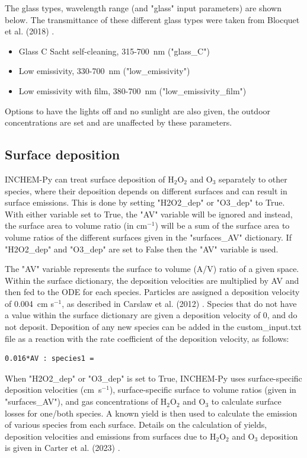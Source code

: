 \documentclass[a4paper]{refart}
\begin{document}
The glass types, wavelength range (and "glass" input parameters) are shown below. The transmittance of these different glass types were taken from Blocquet et al. (2018) \cite{Blocquet2018}.
\begin{itemize}
    \item Glass C Sacht self-cleaning, 315-700~nm ("glass\_C")
    \item Low emissivity, 330-700~nm ("low\_emissivity")
    \item Low emissivity with film, 380-700~nm ("low\_emissivity\_film")
\end{itemize}

Options to have the lights off and no sunlight are also given, the outdoor concentrations are set and are unaffected by these parameters.

\subsection{Surface deposition}\label{surface_dictionary.py}
INCHEM-Py can treat surface deposition of H$_2$O$_2$ and O$_3$ separately to other species, where their deposition depends on different surfaces and can result in surface emissions. This is done by setting "H2O2\_dep" or "O3\_dep" to True. With either variable set to True, the "AV" variable will be ignored and instead, the surface area to volume ratio (in cm$^{-1}$) will be a sum of the surface area to volume ratios of the different surfaces given in the "surfaces\_AV" dictionary. If "H2O2\_dep" and "O3\_dep" are set to False then the "AV" variable is used.

The "AV" variable represents the surface to volume (A/V) ratio of a given space. Within the surface dictionary, the deposition velocities are multiplied by AV and then fed to the ODE for each species. Particles are assigned a deposition velocity of 0.004~cm s$^{-1}$, as described in Carslaw et al. (2012) \cite{Carslaw2012}. Species that do not have a value within the surface dictionary are given a deposition velocity of 0, and do not deposit. Deposition of any new species can be added in the custom\_input.txt file as a reaction with the rate coefficient of the deposition velocity, as follows: 
\begin{verbatim}
0.016*AV : species1 =
\end{verbatim}

When "H2O2\_dep" or "O3\_dep" is set to True, INCHEM-Py uses 
surface-specific deposition velocities (cm~s$^{-1}$), surface-specific surface to volume ratios (given in "surfaces\_AV"), and gas concentrations of H$_2$O$_2$ and O$_3$ to calculate surface losses for one/both species.
A known yield is then used to calculate the emission of various species from each surface. Details on the calculation of yields, deposition velocities and emissions from surfaces due to H$_2$O$_2$ and O$_3$ deposition is given in Carter et al. (2023) \cite{Carter2023}.
\end{document}

